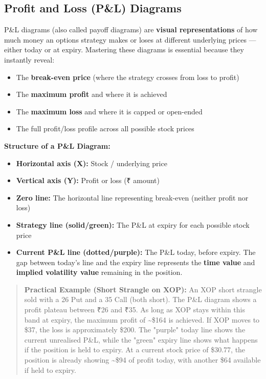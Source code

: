\documentclass[12pt,openany]{book}
\begin{document}
\subsection{Profit and Loss (P\&L) Diagrams}

P\&L diagrams (also called payoff diagrams) are \textbf{visual representations} of how much money an options strategy makes or loses at different underlying prices — either today or at expiry. Mastering these diagrams is essential because they instantly reveal:

\begin{itemize}[leftmargin=*]
    \item The \textbf{break-even price} (where the strategy crosses from loss to profit)
    \item The \textbf{maximum profit} and where it is achieved
    \item The \textbf{maximum loss} and where it is capped or open-ended
    \item The full profit/loss profile across all possible stock prices
\end{itemize}

\textbf{Structure of a P\&L Diagram:}
\begin{itemize}[leftmargin=*]
    \item \textbf{Horizontal axis (X):} Stock / underlying price
    \item \textbf{Vertical axis (Y):} Profit or loss (₹ amount)
    \item \textbf{Zero line:} The horizontal line representing break-even (neither profit nor loss)
    \item \textbf{Strategy line (solid/green):} The P\&L at expiry for each possible stock price
    \item \textbf{Current P\&L line (dotted/purple):} The P\&L today, before expiry. The gap between today's line and the expiry line represents the \textbf{time value} and \textbf{implied volatility value} remaining in the position.
\end{itemize}

\begin{quote}
\textbf{Practical Example (Short Strangle on XOP):} An XOP short strangle sold with a 26 Put and a 35 Call (both short). The P\&L diagram shows a profit plateau between ₹26 and ₹35. As long as XOP stays within this band at expiry, the maximum profit of \textasciitilde{}\$164 is achieved. If XOP moves to \$37, the loss is approximately \$200. The "purple" today line shows the current unrealised P\&L, while the "green" expiry line shows what happens if the position is held to expiry. At a current stock price of \$30.77, the position is already showing \textasciitilde{}\$94 of profit today, with another \$64 available if held to expiry.
\end{quote}
\end{document}
